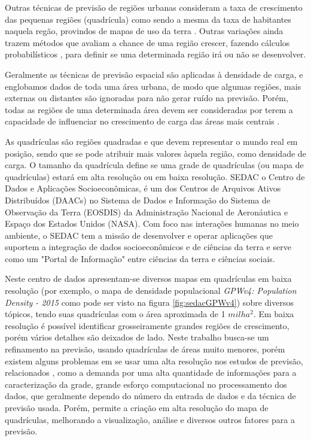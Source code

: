 Outras técnicas de previsão de regiões urbanas consideram a taxa de crescimento das pequenas regiões (quadrícula) como sendo a mesma da taxa de habitantes naquela regão, provindos de mapas de uso da terra \cite{wu2002data}. Outras variações ainda trazem métodos que avaliam a chance de uma região crescer, fazendo cálculos probabilísticos \cite{melo2015spatial}, \cite{arango2004spatial} para definir se uma determinada região irá ou não se desenvolver.

Geralmente as técnicas de previsão espacial são aplicadas à densidade de carga, e englobamos dados de toda uma área urbana\cite{willis2007spatial}, de modo que algumas regiões, mais externas ou distantes são ignoradas para não gerar ruído na previsão. Porém, todas as regiões de uma determinada área devem ser consideradas por terem a capacidade de influenciar no crescimento de carga das áreas mais centrais \cite{willis2002spatial}.

As quadrículas são regiões quadradas e que devem representar o mundo real em posição, sendo que se pode atribuir mais valores àquela região, como densidade de carga. O tamanho da quadrícula define se uma grade de quadrículas (ou mapa de quadrículas) estará em alta resolução ou em baixa resolução. SEDAC o Centro de Dados e Aplicações Socioeconômicas, é um dos Centros de Arquivos Ativos Distribuídos (DAACs) no Sistema de Dados e Informação do Sistema de Observação da Terra (EOSDIS) da Administração Nacional de Aeronáutica e Espaço dos Estados Unidos (NASA). Com foco nas interações humanas no meio ambiente, o SEDAC tem a missão de desenvolver e operar aplicações que suportem a integração de dados socioeconômicos e de ciências da terra e serve como um "Portal de Informação" entre ciências da terra e ciências sociais. 

Neste centro de dados apresentam-se diversos mapas em quadrículas em baixa resolução (por exemplo, o mapa de densidade populacional \emph{GPWv4: Population Density - 2015} \cite{SEDAC2016} como pode ser visto na figura \ref{fig:sedacGPWv4}) sobre diversos tópicos, tendo suas quadrículas com o área aproximada de 1 \(milha^2\). Em baixa resolução é possível identificar grosseiramente grandes regiões de crescimento, porém vários detalhes são deixados de lado. Neste trabalho busca-se um refinamento na previsão, usando quadrículas de áreas muito menores, porém existem alguns problemas em se usar uma alta resolução nos estudos de previsão, relacionados \cite{longley1996spatial}, como a demanda por uma alta quantidade de informações para a caracterização da grade, grande esforço computacional no processamento dos dados, que geralmente dependo do número da entrada de dados e da técnica de previsão usada. Porém, permite a criação em alta resolução do mapa de quadrículas, melhorando a visualização, análise e diversos outros fatores para a previsão. 

